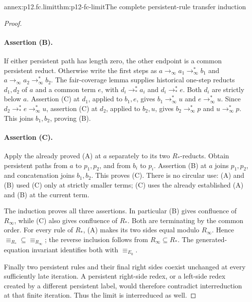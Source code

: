 \begin{annexitem}{annex:p12.fc.limit}{thm:p12-fc-limit}{The complete persistent-rule transfer induction}
\begin{proof}
\paragraph{Assertion (B).}
If either persistent path has length zero, the other endpoint is
a common persistent reduct. Otherwise write the first steps as
\(a\to_\infty a_1\to_\infty^*b_1\) and
\(a\to_\infty a_2\to_\infty^*b_2\).
The fair-coverage lemma supplies historical one-step reducts
\(d_1,d_2\) of \(a\) and a common term \(e\), with
\(d_i\to_*^*a_i\) and \(d_i\to_*^*e\).
Both \(d_i\) are strictly below \(a\). Assertion (C) at
\(d_1\), applied to \(b_1,e\), gives
\(b_1\to_\infty^*u\) and \(e\to_\infty^*u\).
Since \(d_2\to_*^*e\to_\infty^*u\), assertion (C) at
\(d_2\), applied to \(b_2,u\), gives
\(b_2\to_\infty^*p\) and \(u\to_\infty^*p\).
This joins \(b_1,b_2\), proving (B).

\paragraph{Assertion (C).}
Apply the already proved (A) at \(a\) separately to its two
\(R_*\)-reducts. Obtain persistent paths from \(a\) to
\(p_1,p_2\), and from \(b_i\) to \(p_i\).
Assertion (B) at \(a\) joins \(p_1,p_2\), and concatenation
joins \(b_1,b_2\). This proves (C). There is no circular use:
(A) and (B) used (C) only at strictly smaller terms; (C) uses
the already established (A) and (B) at the current term.

The induction proves all three assertions. In particular (B)
gives confluence of \(R_\infty\), while (C) also gives
confluence of \(R_*\). Both are terminating by the common order.
For every rule of \(R_*\), (A) makes its two sides equal
modulo \(R_\infty\). Hence
\(\equiv_{R_*}\subseteq\equiv_{R_\infty}\); the reverse
inclusion follows from \(R_\infty\subseteq R_*\).
The generated-equation invariant identifies both with
\(\equiv_{E_0}\).

Finally two persistent rules and their final right sides coexist
unchanged at every sufficiently late iteration. A persistent
right-side redex, or a left-side redex created by a different
persistent label, would therefore contradict interreduction at
that finite iteration. Thus the limit is interreduced as well.
\end{proof}
\end{annexitem}

